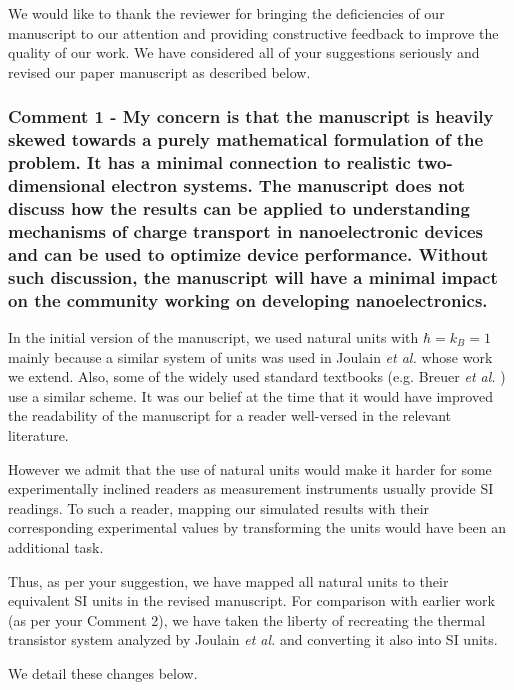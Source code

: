 \documentclass{article}
\begin{document}
We would like to thank the reviewer for bringing the deficiencies of our manuscript to our attention and providing constructive feedback to improve the quality of our work. We have considered all of your suggestions seriously and revised our paper manuscript as described below.

\subsubsection*{Comment 1 -
\color{RoyalBlue} My concern is that the manuscript is heavily skewed towards a purely mathematical formulation of the problem. It has a minimal connection to realistic two-dimensional electron systems. The manuscript does not discuss how the results can be applied to understanding mechanisms of charge transport in nanoelectronic devices and can be used to optimize device performance. Without such discussion, the manuscript will have a minimal impact on the community working on developing nanoelectronics.}

In the initial version of the manuscript, we used natural units with $\hbar=k_B=1$ mainly because a similar system of units was used in Joulain \textit{et al.} \cite{mahan00} whose work we extend. Also, some of the widely used standard textbooks (e.g. Breuer \textit{et al.} \cite{breuer2002theory}) use a similar scheme. It was our belief at the time that it would have improved the readability of the manuscript for a reader well-versed in the relevant literature.

However we admit that the use of natural units would make it harder for some experimentally inclined readers as measurement instruments usually provide SI readings. To such a reader, mapping our simulated results with their corresponding experimental values by transforming the units would have been an additional task.

Thus, as per your suggestion, we have mapped all natural units to their equivalent SI units in the revised manuscript. For comparison with earlier work (as per your Comment 2), we have taken the liberty of recreating the thermal transistor system analyzed by Joulain \textit{et al.} \cite{joulain2016quantum} and converting it also into SI units.

We detail these changes below.
\end{document}
